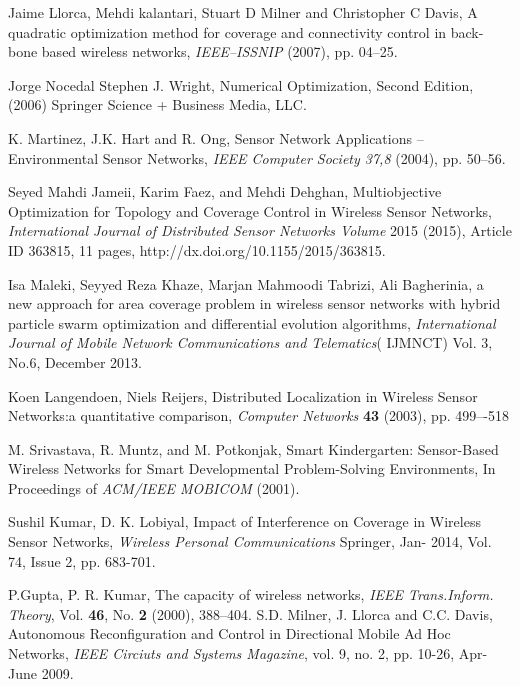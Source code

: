 \documentclass[11pt]{article}
\numberwithin{equation}{section}
\begin{document}
\begin{thebibliography}{99}
 Jaime Llorca, Mehdi kalantari, Stuart D Milner and Christopher C Davis, A quadratic optimization method for coverage and connectivity control in back-bone based wireless networks, \textit{IEEE--ISSNIP} (2007), pp. 04--25.



 Jorge Nocedal Stephen J. Wright, Numerical Optimization, Second Edition, (2006) Springer Science + Business Media, LLC.




 K. Martinez, J.K. Hart and R. Ong, Sensor Network Applications – Environmental Sensor Networks, \textit{IEEE Computer Society 37,8} (2004), pp. 50--56.

 Seyed Mahdi Jameii, Karim Faez, and Mehdi Dehghan,  Multiobjective Optimization for Topology and Coverage Control in Wireless Sensor Networks, \emph{International Journal of Distributed Sensor Networks
Volume }2015 (2015), Article ID 363815, 11 pages, http://dx.doi.org/10.1155/2015/363815.


 Isa Maleki, Seyyed Reza Khaze, Marjan Mahmoodi Tabrizi, Ali Bagherinia, a new approach for area coverage problem in wireless sensor networks with hybrid particle swarm optimization and differential evolution algorithms, \emph{International Journal of Mobile Network Communications and Telematics}( IJMNCT) Vol. 3, No.6, December 2013.

 Koen Langendoen, Niels Reijers, Distributed Localization in Wireless Sensor Networks:a quantitative comparison, \textit{Computer Networks} \textbf{43} (2003), pp. 499–-518

 M. Srivastava, R. Muntz, and M. Potkonjak, Smart Kindergarten: Sensor-Based Wireless Networks for Smart Developmental Problem-Solving Environments, In Proceedings of \textit{ACM/IEEE MOBICOM }(2001).


  Sushil Kumar, D. K. Lobiyal, Impact of Interference on Coverage in Wireless Sensor Networks, \emph{Wireless Personal Communications} Springer, Jan- 2014, Vol. 74, Issue 2, pp. 683-701.




 P.Gupta, P. R. Kumar, The capacity of wireless networks, \textit{IEEE Trans.Inform. Theory}, Vol. \textbf{46}, No. \textbf{2} (2000), 388--404.
 S.D. Milner, J. Llorca and C.C. Davis, Autonomous Reconfiguration and Control in Directional Mobile Ad Hoc Networks, \textit{IEEE Circiuts and Systems Magazine}, vol. 9, no. 2, pp. 10-26, Apr-June 2009.






\end{thebibliography}
\end{document}
